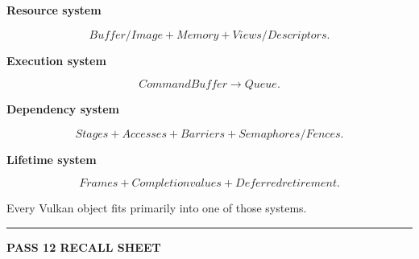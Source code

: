\textbf{Resource system}

\[
Buffer/Image
+
Memory
+
Views/Descriptors.
\]

\textbf{Execution system}

\[
CommandBuffer
\rightarrow
Queue.
\]

\textbf{Dependency system}

\[
Stages
+
Accesses
+
Barriers
+
Semaphores/Fences.
\]

\textbf{Lifetime system}

\[
Frames
+
Completion values
+
Deferred retirement.
\]

Every Vulkan object fits primarily into one of those systems.

\begin{center}\rule{0.5\linewidth}{0.5pt}\end{center}

\textbf{PASS 12 RECALL SHEET}

